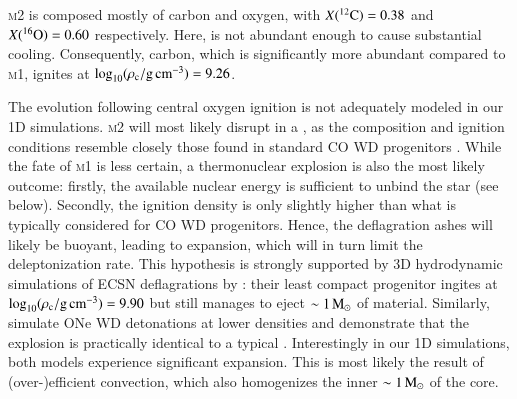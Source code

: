 \documentclass[twocolumn]{aa}
\begin{document}
\textsc{m2} is composed mostly of carbon and oxygen, with $\abun{C}{12}=0.38$ and $\abun{O}{16}=0.60$ respectively. 
 Here,  is not abundant enough to cause  substantial cooling. Consequently, carbon, which is significantly more abundant compared to \textsc{m1}, ignites at $\logrhoc=9.26$. 
 
The evolution following central oxygen ignition is not adequately modeled in our 1D simulations. 
 \textsc{m2} will most likely disrupt in a \ia, as the composition and
 ignition conditions resemble closely those found in standard CO WD \ia
 progenitors \citep{Nomoto:1982zz}. While the fate of \textsc{m1} is less 
 certain, a thermonuclear explosion is also the most likely outcome: 
 firstly, the available nuclear energy is sufficient to unbind the star (see 
 below). Secondly, the ignition density is only slightly higher than  what is typically considered for CO WD \ia progenitors. 
 Hence, the deflagration ashes will likely be buoyant, leading to expansion, which will in turn limit the deleptonization rate. This hypothesis is strongly supported
 by 3D hydrodynamic  simulations of ECSN deflagrations by \cite{Jones:2016asr,Jones:2018ule}: their least compact progenitor ingites at $\logrhoc=9.90$ but still manages to eject  $\sim 1\msun$ of material. 
 Similarly,  \cite{marquardt2015} simulate ONe WD detonations at lower 
 densities and demonstrate that the explosion is practically identical to a 
 typical \ia. 
 Interestingly in our 1D simulations, both models experience significant expansion. This is most likely the result of (over-)efficient convection, which also homogenizes the inner $\sim 1\msun$ of the core. 
 
 
 
 
\end{document}
